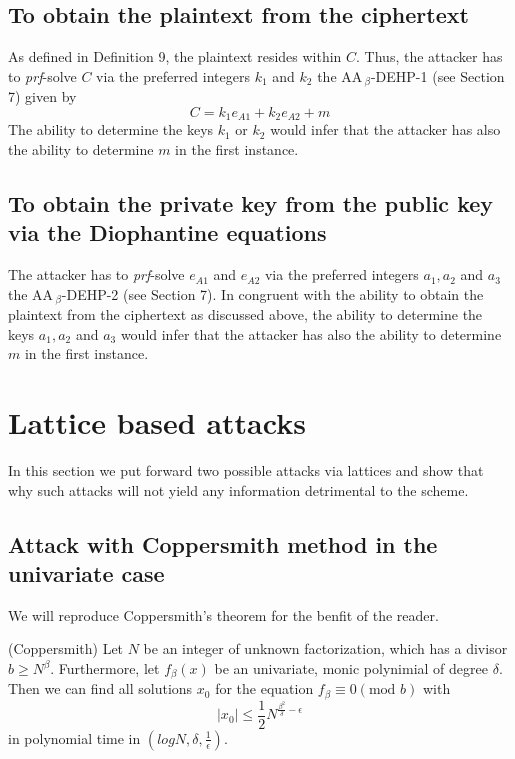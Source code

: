 \documentclass{llncs}
\begin{document}
\subsection{To obtain the plaintext from the ciphertext}
As defined in Definition 9, the plaintext resides within $C$.
Thus, the attacker has to \textit{prf}-solve $C$ via the preferred
integers $k_{1}$ and $k_{2}$ the AA\,$_{\beta}$-DEHP-1 (see
Section 7) given by
\begin{equation}
C=k_{1}e_{A1}+k_{2}e_{A2}+m
\end{equation}
The ability to determine the keys $k_{1}$ or $k_{2}$ would infer
that the attacker has also the ability to determine $m$ in the
first instance.

\subsection{To obtain the private key from the public key via the Diophantine equations}
The attacker has to \textit{prf}-solve $e_{A1}$ and $e_{A2}$ via
the preferred integers $a_{1}, a_{2}$ and $a_{3}$ the
AA\,$_{\beta}$-DEHP-2 (see Section 7). In congruent with the
ability to obtain the plaintext from the ciphertext as discussed
above, the ability to determine the keys $a_{1}, a_{2}$ and
$a_{3}$ would infer that the attacker has also the ability to
determine $m$ in the first instance.

\section{Lattice based attacks}
In this section we put forward two possible attacks via lattices
and show that why such attacks will not yield any information
detrimental to the scheme.

\subsection{Attack with Coppersmith method in the univariate case}
We will reproduce Coppersmith's theorem for the benfit of the
reader.

\begin{theorem}(Coppersmith)
Let $N$ be an integer of unknown factorization, which has a
divisor $b\geq N^{\beta}$. Furthermore, let $f_{\beta}(x)$ be an
univariate, monic polynimial of degree $\delta$. Then we can find
all solutions $x_{0}$ for the equation $f_{\beta}\equiv 0
(\textrm{mod } b)$ with
$$
\mid x_{0}\mid \leq \frac{1}{2} N^{\frac{\beta^{2}}{\delta} - \epsilon}
$$
in polynomial time in $(log N, \delta, \frac{1}{\epsilon})$.
\end{theorem}
\end{document}
